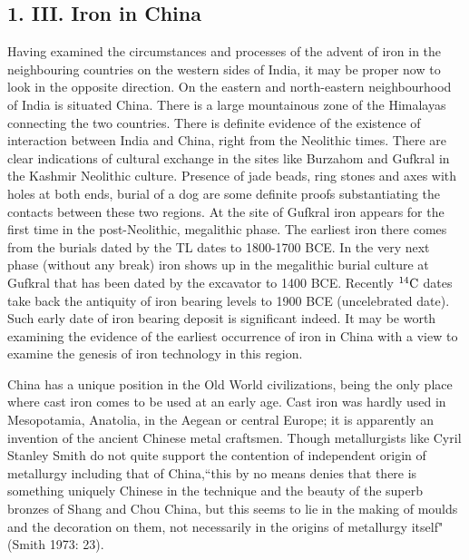 \vspace{-.3cm}

\subsection*{1. III. Iron in China}\label{chapter3-subsection-3}

\vspace{-.2cm}

Having examined the circumstances and processes of the advent of iron in the neighbouring countries on the western sides of India, it may be proper now to look in the opposite direction. On the eastern and north-eastern neighbourhood of India is situated China. There is a large mountainous zone of the Himalayas connecting the two countries. There is definite evidence of the existence of interaction between India and China, right from the Neolithic times. There are clear indications of cultural exchange in the sites like Burzahom and Gufkral in the Kashmir Neolithic culture. Presence of jade beads, ring stones and axes with holes at both ends, burial of a dog are some definite proofs substantiating the contacts between these two regions. At the site of Gufkral iron appears for the first time in the post-Neolithic, megalithic phase. The earliest iron there comes from the burials dated by the TL dates to 1800-1700 BCE. In the very next phase (without any break) iron shows up in the megalithic burial culture at Gufkral that has been dated by the excavator to 1400 BCE. Recently $^{14}{\rm C}$ dates take back the antiquity of iron bearing levels to 1900 BCE (uncelebrated date). Such early date of iron bearing deposit is significant indeed. It may be worth examining the evidence of the earliest occurrence of iron in China with a view to examine the genesis of iron technology in this region.

China has a unique position in the Old World civilizations, being the only place where cast iron comes to be used at an early age. Cast iron was hardly used in Mesopotamia, Anatolia, in the Aegean or central Europe; it is apparently an invention of the ancient Chinese metal craftsmen. Though metallurgists like Cyril Stanley Smith do not quite support the contention of independent origin of metallurgy including that of China,``this by no means denies that there is something uniquely Chinese in the technique and the beauty of the superb bronzes of Shang and Chou China, but this seems to lie in the making of moulds and the decoration on them, not necessarily in the origins of metallurgy itself" (Smith 1973: 23).

